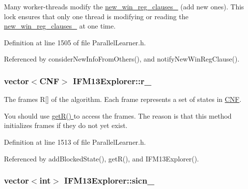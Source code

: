 Many worker-\/threads modify the \hyperlink{classIFM13Explorer_a712b3dc6c099b1e3697e7b8877e0cd90}{new\-\_\-win\-\_\-reg\-\_\-clauses\-\_\-} (add new ones). This lock ensures that only one thread is modifying or reading the \hyperlink{classIFM13Explorer_a712b3dc6c099b1e3697e7b8877e0cd90}{new\-\_\-win\-\_\-reg\-\_\-clauses\-\_\-} at one time. 

Definition at line 1505 of file Parallel\-Learner.\-h.



Referenced by consider\-New\-Info\-From\-Others(), and notify\-New\-Win\-Reg\-Clause().

\hypertarget{classIFM13Explorer_a559dde7f5e4e528ea495c1f4a4d1d072}{
\subsubsection[{r\-\_\-}]{\setlength{\rightskip}{0pt plus 5cm}vector$<${\bf C\-N\-F}$>$ I\-F\-M13\-Explorer\-::r\-\_\-\hspace{0.3cm}{\ttfamily [protected]}}}\label{classIFM13Explorer_a559dde7f5e4e528ea495c1f4a4d1d072}


The frames R\mbox{[}\mbox{]} of the algorithm. Each frame represents a set of states in \hyperlink{classCNF}{C\-N\-F}. 

You should use \hyperlink{classIFM13Explorer_a75a0b20fe6d76b6d1fa52d447fa24d10}{get\-R() } to access the frames. The reason is that this method initializes frames if they do not yet exist. 

Definition at line 1513 of file Parallel\-Learner.\-h.



Referenced by add\-Blocked\-State(), get\-R(), and I\-F\-M13\-Explorer().

\hypertarget{classIFM13Explorer_ad04fb2b668ee928c9c38c61ec1e168ef}{
\subsubsection[{sicn\-\_\-}]{\setlength{\rightskip}{0pt plus 5cm}vector$<$int$>$ I\-F\-M13\-Explorer\-::sicn\-\_\-\hspace{0.3cm}{\ttfamily [protected]}}}\label{classIFM13Explorer_ad04fb2b668ee928c9c38c61ec1e168ef}


